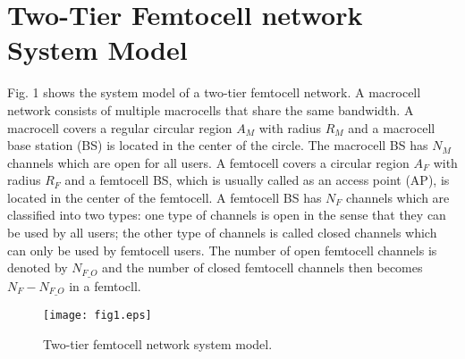 \documentclass[10pt,final,journal,letterpaper,twoside,twocolumn]{IEEEtran}
\begin{document}
\section{Two-Tier Femtocell network System Model}
\label{sec2}

Fig. 1 shows the system model of a two-tier femtocell network. A macrocell
network consists of multiple macrocells that share the same bandwidth. A
macrocell covers a regular circular region ${A_M}$ with radius ${R_M}$  and a
macrocell base station (BS) is located in the center of the circle. The macrocell BS has
${N_M}$ channels which are open for all users. A femtocell covers a circular region ${A_F}$  with radius ${R_F}$ and a femtocell BS, which is usually called as an access point (AP), is located in the center of the femtocell. A femtocell BS has ${N_F}$ channels
which are classified into two types: one type of channels is open in the
sense that they can be used by all users; the other type of channels is
called closed channels which can only be used by femtocell users. The number
of open femtocell channels is denoted by ${N_{F\_O}}$ and the number of
closed femtocell channels then becomes ${N_F} - {N_{F\_O}}$ in a femtocll.

\begin{figure}
\vspace{0.1in}
\centerline{\texttt{[image: fig1.eps]}}
\caption{\small Two-tier femtocell network system model.}
\end{figure}
\end{document}
